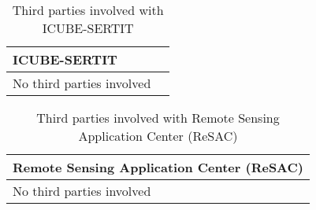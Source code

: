 \begin{table}[H]
	\centering
	\begin{tabular}{|p{10cm} p{4cm}|}
		\hline
		
		\multicolumn{2}{|p{14cm}|}{\textbf{ICUBE-SERTIT}}\\
		
		\hline
		
		No third parties involved & \\
		
		\hline
		
	\end{tabular}
	\caption{Third parties involved with ICUBE-SERTIT}
\end{table}



\begin{table}[H]
	\centering
	\begin{tabular}{|p{10cm} p{4cm}|}
		\hline
		
		\multicolumn{2}{|p{14cm}|}{\textbf{Remote Sensing Application Center (ReSAC)}}\\
		
		\hline
		
		No third parties involved & \\
		
		\hline
	\end{tabular}
	\caption{Third parties involved with Remote Sensing Application Center (ReSAC)}
\end{table}



